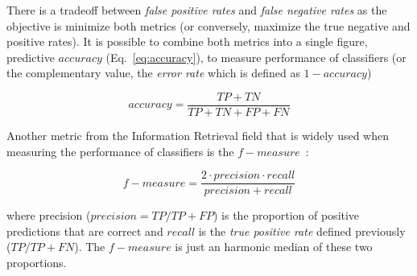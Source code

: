 \documentclass{elsart}
\begin{document}

There is a tradeoff between \emph{false positive rates} and \emph{false negative rates} as the objective is minimize both
metrics (or conversely, maximize the true negative and positive rates). It is possible to combine both metrics into a single figure, predictive $accuracy$ (Eq.~\ref{eq:accuracy}), to measure performance of classifiers (or the complementary value, the
\emph{error rate} which is defined as $1-accuracy$)


\begin{equation}\label{eq:accuracy}
    accuracy = \frac{TP + TN}{TP + TN + FP + FN}
\end{equation}

Another metric from the Information Retrieval field that is widely used when measuring the performance of classifiers is the
$f-measure$~\cite{WF05}:

\begin{equation}\label{eq:fmeasure}
    f-measure = \frac{2 \cdot precision \cdot recall}{precision + recall}
\end{equation}

\noindent where precision ($precision = TP/TP+FP$) is the proportion of positive predictions that are correct  and $recall$ is the
\emph{true positive rate} defined previously ($TP/TP+FN$). The $f-measure$ is just an harmonic median of these two proportions.
\end{document}
